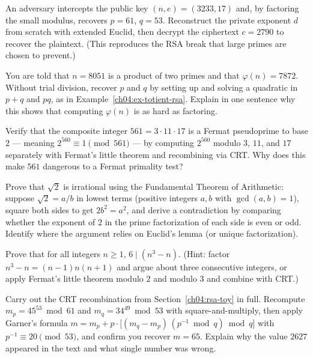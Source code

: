\begin{exercise}
An adversary intercepts the public key $(n, e) = (3233, 17)$ and, by factoring the small modulus,
recovers $p = 61$, $q = 53$. Reconstruct the private exponent $d$ from scratch with extended Euclid,
then decrypt the ciphertext $c = 2790$ to recover the plaintext. (This reproduces the RSA break that
large primes are chosen to prevent.)
\end{exercise}

\begin{exercise}
You are told that $n = 8051$ is a product of two primes and that $\varphi(n) = 7872$. Without
trial division, recover $p$ and $q$ by setting up and solving a quadratic in $p + q$ and $pq$, as in
Example~\ref{ch04:ex-totient-rsa}. Explain in one sentence why this shows that computing
$\varphi(n)$ is as hard as factoring.
\end{exercise}

\begin{exercise}
Verify that the composite integer $561 = 3 \cdot 11 \cdot 17$ is a Fermat pseudoprime to base $2$ ---
meaning $2^{560} \equiv 1 \pmod{561}$ --- by computing $2^{560}$ modulo $3$, $11$, and $17$
separately with Fermat's little theorem and recombining via CRT. Why does this make $561$ dangerous
to a Fermat primality test?
\end{exercise}

\begin{exercise}
Prove that $\sqrt{2}$ is irrational using the Fundamental Theorem of Arithmetic: suppose
$\sqrt 2 = a/b$ in lowest terms (positive integers $a, b$ with $\gcd(a, b) = 1$), square both sides
to get $2b^2 = a^2$, and derive a contradiction by comparing whether the exponent of $2$ in the
prime factorization of each side is even or odd. Identify where the argument relies on Euclid's
lemma (or unique factorization).
\end{exercise}

\begin{exercise}
Prove that for all integers $n \ge 1$, $6 \mid (n^3 - n)$. (Hint: factor $n^3 - n = (n-1)n(n+1)$ and
argue about three consecutive integers, or apply Fermat's little theorem modulo $2$ and modulo $3$
and combine with CRT.)
\end{exercise}

\begin{exercise}
Carry out the CRT recombination from Section~\ref{ch04:rsa-toy} in full. Recompute
$m_p = 45^{53} \bmod 61$ and $m_q = 34^{49} \bmod 53$ with square-and-multiply, then apply Garner's
formula $m = m_p + p\cdot\bigl[(m_q - m_p)\,(p^{-1}\bmod q)\bmod q\bigr]$ with
$p^{-1} \equiv 20 \pmod{53}$, and confirm you recover $m = 65$. Explain why the value $2627$
appeared in the text and what single number was wrong.
\end{exercise}
